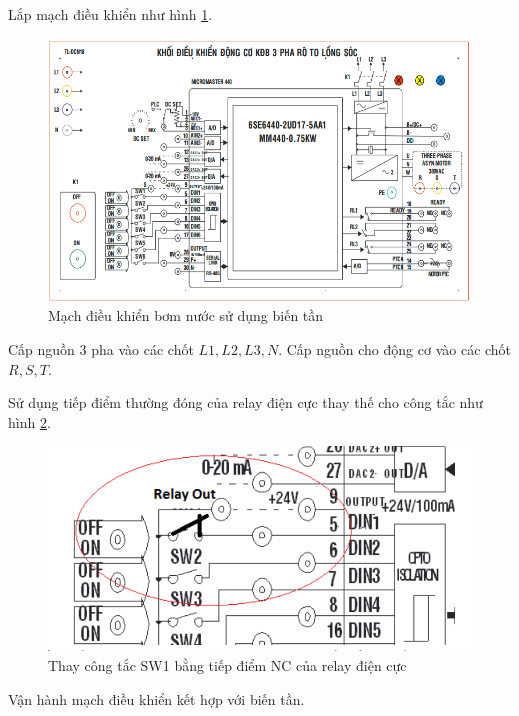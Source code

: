 \documentclass[13pt,a4paper]{extarticle}
\begin{document}
\begin{list}{--}{}
\item Lắp mạch điều khiển như hình \ref{Fig:bien-tan}.
\begin{figure}[!h]
\begin{center}
\includegraphics[scale=.7]{2}
\end{center}
\caption{Mạch điều khiển bơm nước sử dụng biến tần}
\label{Fig:bien-tan}
\end{figure}
\item Cấp nguồn 3 pha vào các chốt $L1,L2,L3,N$. Cấp nguồn cho động cơ vào các chốt $R,S,T$.
\item Sử dụng tiếp điểm thường đóng của relay điện cực thay thế cho công tắc như hình \ref{Fig:NC-relay}.
\begin{figure}[!h]
\begin{center}
\includegraphics[scale=.4]{3}
\end{center}
\caption{Thay công tắc SW1 bằng tiếp điểm NC của relay điện cực}
\label{Fig:NC-relay}
\end{figure}
\item Vận hành mạch điều khiển kết hợp với biến tần.
\begin{list}{+}{}

\end{list}
\end{list}
\end{document}
